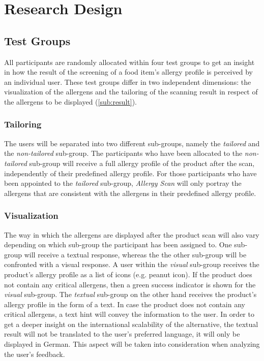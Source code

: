 \chapter{Research Design}
\thispagestyle{fancy}

\section{Test Groups}
\label{sec:text-groups}
All participants are randomly allocated within four test groups to get an insight in how the result of the screening of a food item’s allergy profile is perceived by an individual user. These test groups differ in two independent dimensions: the visualization of the allergens and the tailoring of the scanning result in respect of the allergens to be displayed (\cref{sub:result}).

\subsection{Tailoring}
The users will be separated into two different sub-groups, namely the \emph{tailored} and the \emph{non-tailored} sub-group. The participants who have been allocated to the \emph{non-tailored} sub-group will receive a full allergy profile of the product after the scan, independently of their predefined allergy profile. For those participants who have been appointed to the \emph{tailored} sub-group, \emph{Allergy Scan} will only portray the allergens that are consistent with the allergens in their predefined allergy profile. 

\subsection{Visualization}
The way in which the allergens are displayed after the product scan will also vary depending on which sub-group the participant has been assigned to. One sub-group will receive a textual response, whereas the the other sub-group will be confronted with a visual response. A user within the \emph{visual} sub-group receives the product’s allergy profile as a list of icons (e.g. peanut icon). If the product does not contain any critical allergens, then a green success indicator is shown for the \emph{visual} sub-group. The \emph{textual} sub-group on the other hand receives the product's allergy profile in the form of a text. In case the product does not contain any critical allergens, a text hint will convey the information to the user. In order to get a deeper insight on the international scalability of the alternative, the textual result will not be translated to the user's preferred language, it will only be displayed in German. This aspect will be taken into consideration when analyzing the user's feedback.

